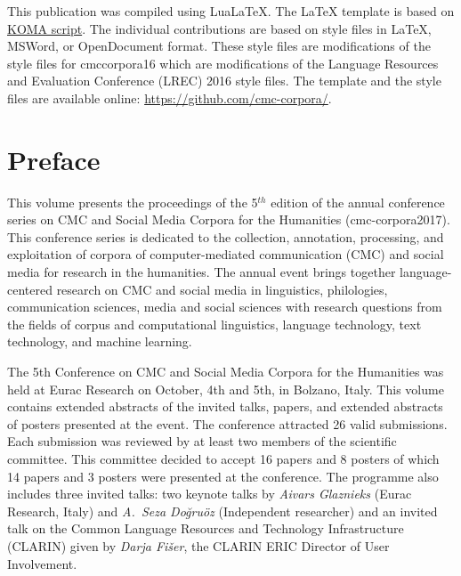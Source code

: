 \vfill

\noindent
This publication was compiled using Lua\LaTeX{}.  The \LaTeX{} template is
based on \href{http://www.komascript.de/}{KOMA script}.  The individual
contributions are based on style files in \LaTeX, MSWord, or OpenDocument
format.  These style files are modifications of the style files for
cmccorpora16 which are modifications of the Language Resources and Evaluation
Conference (LREC) 2016 style files.  The template and the style files are
available online:
\href{https://github.com/cmc-corpora/}{https://github.com/cmc-corpora/}.


\smallskip

\doclicenseThis
\thispagestyle{empty}
\clearpage


\chapter*{Preface}
{}
This volume presents the proceedings of the 5{$^{th}$} edition of the annual conference series on CMC and Social Media Corpora for the Humanities (cmc-corpora2017). This conference series is dedicated to the collection, annotation, processing, and exploitation of corpora of computer-mediated communication (CMC) and social media for research in the humanities. The annual event brings together language-centered research on CMC and social media in linguistics, philologies, communication sciences, media and social sciences with research questions from the fields of corpus and computational linguistics, language technology, text technology, and machine learning.

The 5th Conference on CMC and Social Media Corpora for the Humanities was held at Eurac Research on October, 4th and 5th, in Bolzano, Italy. This volume contains extended abstracts of the invited talks, papers, and extended abstracts of posters presented at the event. The conference attracted 26 valid submissions. Each submission was reviewed by at least two members of the scientific committee. This committee decided to accept 16 papers and 8 posters of which 14 papers and 3 posters were presented at the conference. The programme also includes three invited talks: two keynote talks by \textit{Aivars Glaznieks} (Eurac Research, Italy) and \textit{A.~Seza Do\u{g}ru\"oz} (Independent researcher) and an invited talk on the Common Language Resources and Technology Infrastructure (CLARIN) given by \textit{Darja Fi\v{s}er}, the CLARIN ERIC Director of User Involvement.

